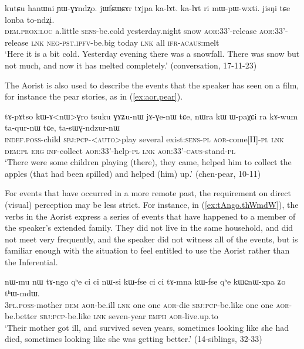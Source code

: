 \begin{exe}
\ex \label{ex:jWfCWCAr.tAjpa.kalAt}
 \gll kutɕu hanɯni ɲɯ-ɣɤndʐo. jɯfɕɯɕɤr tɤjpa ka-lɤt. ka-lɤt ri mɯ-pɯ-wxti. jisŋi tɕe lonba to-ndʐi. \\
 \textsc{dem}.\textsc{prox}:\textsc{loc} a.little \textsc{sens}-be.cold yesterday.night snow \textsc{aor}:3\fl{}3'-release \textsc{aor}:3\fl{}3'-release  \textsc{lnk} \textsc{neg}-\textsc{pst}.\textsc{ipfv}-be.big today \textsc{lnk} all \textsc{ifr}-\textsc{acaus}:melt \\
\glt `Here it is a bit cold. Yesterday evening there was a snowfall. There was snow but not much, and now it has melted completely.' (conversation, 17-11-23)
\end{exe}

The Aorist is also used to describe the events that the speaker has seen on a film, for instance the pear stories, as in (\ref{ex:aor.pear}). 

\begin{exe}
\ex \label{ex:aor.pear}
 \gll tɤ-pɤtso kɯ-ɤ<nɯ>ɣro tsuku ɣɤʑu-nɯ jɤ-ɣe-nɯ tɕe, nɯra kɯ ɯ-paχɕi ra kɤ-wum ta-qur-nɯ tɕe, ta-sɯɣ-ndzur-nɯ \\
 \textsc{indef}.\textsc{poss}-child \textsc{sbj}:\textsc{pcp}-<\textsc{auto}>play several exist:\textsc{sens}-\textsc{pl} \textsc{aor}-come[II]-\textsc{pl} \textsc{lnk} \textsc{dem}:\textsc{pl} \textsc{erg} \textsc{inf}-collect \textsc{aor}:3\fl{}3'-help-\textsc{pl} \textsc{lnk} \textsc{aor}:3\fl{}3'-\textsc{caus}-stand-\textsc{pl} \\
 \glt `There were some children playing (there), they came, helped him to collect the apples (that had been spilled) and helped (him) up.' (chen-pear, 10-11)
\end{exe}

For events that have occurred in a more remote past, the requirement on direct (visual) perception may be less strict. For instance, in (\ref{ex:tAngo.thWmdW}), the verbs in the Aorist express a series of events that have happened to a member of the speaker's extended family. They did not live in the same household, and did not meet very frequently, and the speaker did not witness all of the events, but is familiar enough with the situation to feel entitled to use the Aorist rather than the Inferential.

\begin{exe}
\ex \label{ex:tAngo.thWmdW}
 \gll nɯ-mu nɯ tɤ-ngo qʰe ci ci nɯ-si kɯ-fse ci ci tɤ-mna kɯ-fse qʰe kɯɕnɯ-xpa ʑo tʰɯ-mdɯ. \\
 \textsc{3pl}.\textsc{poss}-mother \textsc{dem} \textsc{aor}-be.ill \textsc{lnk} one one \textsc{aor}-die \textsc{sbj}:\textsc{pcp}-be.like  one one \textsc{aor}-be.better  \textsc{sbj}:\textsc{pcp}-be.like \textsc{lnk} seven-year \textsc{emph} \textsc{aor}-live.up.to \\
\glt `Their mother got ill, and survived seven years, sometimes looking like she had died, sometimes looking like she was getting better.' (14-siblings, 32-33)
\end{exe}


